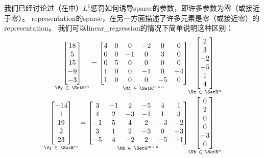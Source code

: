 我们已经讨论过（在中）$L^1$惩罚如何诱导\gls{sparse}的参数，即许多参数为零（或接近于零）。
\gls{representation}的\gls{sparse}，在另一方面描述了许多元素是零（或接近零）的\gls{representation}。
我们可以\gls{linear_regression}的情况下简单说明这种区别：
\begin{align}
\underset{\Vy ~\in~ \SetR^m}{
 \begin{bmatrix}
  18 \\  5 \\ 15 \\ -9 \\ -3
 \end{bmatrix}} = 
 \underset{\MA ~\in~ \SetR^{m \times n}}{
 \begin{bmatrix}
  4 & 0 & 0 & -2 & 0 & 0 \\
  0 & 0 & -1 & 0 & 3 & 0 \\
  0 & 5 & 0 & 0 & 0 & 0 \\
  1 & 0 & 0 & -1 & 0 & -4 \\
  1 & 0 & 0 & 0 & -5 & 0
 \end{bmatrix}} 
  \underset{\Vx ~\in~ \SetR^n}{
  \begin{bmatrix}
 2 \\ 3\\ -2\\ -5 \\ 1 \\ 4
 \end{bmatrix} }\\
 \underset{\Vy ~\in~ \SetR^m}{
 \begin{bmatrix}
  -14 \\  1 \\ 19 \\  2 \\ 23
 \end{bmatrix}} = 
 \underset{\MB ~\in~ \SetR^{m \times n}}{
 \begin{bmatrix}
  3 & -1 & 2 & -5 & 4 & 1 \\
  4 & 2 & -3 & -1 & 1 & 3 \\
  -1 & 5 & 4 & 2 & -3 & -2 \\
  3 & 1 & 2 & -3 & 0 & -3 \\
  -5 & 4 & -2 & 2 & -5 & -1
 \end{bmatrix}} 
  \underset{\Vh ~\in~ \SetR^n}{
  \begin{bmatrix}
 0 \\ 2 \\ 0 \\ 0 \\ -3 \\ 0
 \end{bmatrix} }
\end{align}

